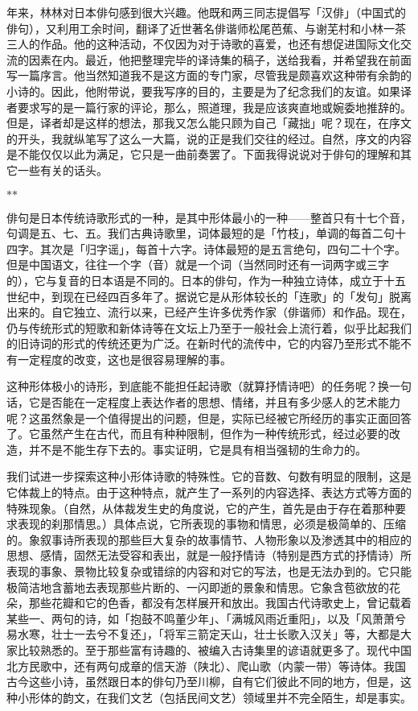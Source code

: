 {    年来，林林对日本俳句感到很大兴趣。他既和两三同志提倡写「汉俳」（中国式的俳句），又利用工余时间，翻译了近世著名俳谐师松尾芭蕉、与谢芜村和小林一茶三人的作品。他的这种活动，不仅因为对于诗歌的喜爱，也还有想促进国际文化交流的因素在内。最近，他把整理完毕的译诗集的稿子，送给我看，并希望我在前面写一篇序言。他当然知道我不是这方面的专门家，尽管我是颇喜欢这种带有余韵的小诗的。因此，他附带说，要我写序的目的，主要是为了纪念我们的友谊。如果译者要求写的是一篇行家的评论，那么，照道理，我是应该爽直地或婉委地推辞的。但是，译者却是这样的想法，那我又怎么能只顾为自己「藏拙」呢？现在，在序文的开头，我就纵笔写了这么一大篇，说的正是我们交往的经过。自然，序文的内容是不能仅仅以此为满足，它只是一曲前奏罢了。下面我得说说对于俳句的理解和其它一些有关的话头。

    \centerline{\hfill$*$\hfill$*$\hfill}

    俳句是日本传统诗歌形式的一种，是其中形体最小的一种——整首只有十七个音，句调是五、七、五。我们古典诗歌里，词体最短的是「竹枝」，单调的每首二句十四字。其次是「归字谣」，每首十六字。诗体最短的是五言绝句，四句二十个字。但是中国语文，往往一个字（音）就是一个词（当然同时还有一词两字或三字的），它与复音的日本语是不同的。日本的俳句，作为一种独立诗体，成立于十五世纪中，到现在已经四百多年了。据说它是从形体较长的「连歌」的「发句」脱离出来的。自它独立、流行以来，已经产生许多优秀作家（俳谐师）和作品。现在，仍与传统形式的短歌和新体诗等在文坛上乃至于一般社会上流行着，似乎比起我们的旧诗词的形式的传统还更为广泛。在新时代的流传中，它的内容乃至形式不能不有一定程度的改变，这也是很容易理解的事。

    这种形体极小的诗形，到底能不能担任起诗歌（就算抒情诗吧）的任务呢？换一句话，它是否能在一定程度上表达作者的思想、情绪，并且有多少感人的艺术能力呢？这虽然象是一个值得提出的问题，但是，实际已经被它所经历的事实正面回答了。它虽然产生在古代，而且有种种限制，但作为一种传统形式，经过必要的改造，并不是不能生存下去的。事实证明，它是具有相当强韧的生命力的。

    我们试进一步探索这种小形体诗歌的特殊性。它的音数、句数有明显的限制，这是它体裁上的特点。由于这种特点，就产生了一系列的内容选择、表达方式等方面的特殊现象。（自然，从体裁发生史的角度说，它的产生，首先是由于存在着那种要求表现的刹那情思。）具体点说，它所表现的事物和情思，必须是极简单的、压缩的。象叙事诗所表现的那些巨大复杂的故事情节、人物形象以及渗透其中的相应的思想、感情，固然无法受容和表出，就是一般抒情诗（特别是西方式的抒情诗）所表现的事象、景物比较复杂或错综的内容和对它的写法，也是无法办到的。它只能极简洁地含蓄地去表现那些片断的、一闪即逝的景象和情思。它象含苞欲放的花朵，那些花瓣和它的色香，都没有怎样展开和放出。我国古代诗歌史上，曾记载着某些一、两句的诗，如「抱鼓不鸣董少年」、「满城风雨近重阳」，以及「风萧萧兮易水寒，壮士一去兮不复还」，「将军三箭定天山，壮士长歌入汉关」等，大都是大家比较熟悉的。至于那些富有诗趣的、被编入古诗集里的谚语就更多了。现代中国北方民歌中，还有两句成章的信天游（陕北）、爬山歌（内蒙一带）等诗体。我国古今这些小诗，虽然跟日本的俳句乃至川柳，自有它们彼此不同的地方，但是，这种小形体的韵文，在我们文艺（包括民间文艺）领域里并不完全陌生，却是事实。

}
